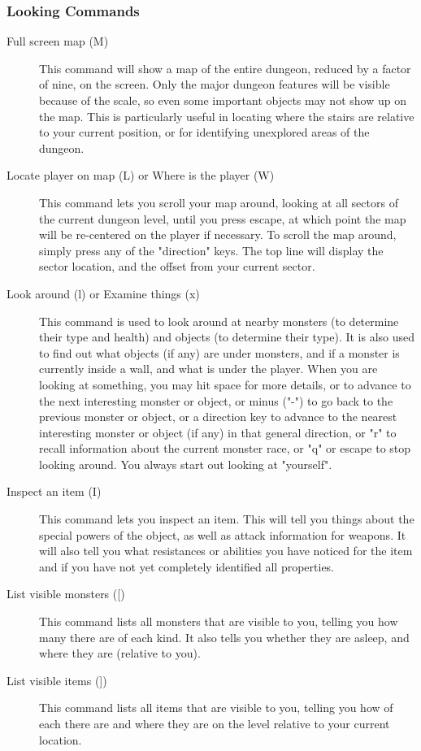 \subsubsection{Looking Commands} 
\begin{description}
\item[Full screen map (M)]
  This command will show a map of the entire dungeon, reduced by a factor
  of nine, on the screen. Only the major dungeon features will be visible
  because of the scale, so even some important objects may not show up on
  the map. This is particularly useful in locating where the stairs are
  relative to your current position, or for identifying unexplored areas
  of the dungeon.

\item[Locate player on map (L) or Where is the player (W)]
  This command lets you scroll your map around, looking at all sectors of
  the current dungeon level, until you press escape, at which point the
  map will be re-centered on the player if necessary. To scroll the map
  around, simply press any of the "direction" keys. The top line will
  display the sector location, and the offset from your current sector.

\item[Look around (l) or Examine things (x)]
  This command is used to look around at nearby monsters (to determine
  their type and health) and objects (to determine their type). It is also
  used to find out what objects (if any) are under monsters, and if a
  monster is currently inside a wall, and what is under the player.  When
  you are looking at something, you may hit space for more details, or to
  advance to the next interesting monster or object, or minus ("-") to go
  back to the previous monster or object, or a direction key to advance to
  the nearest interesting monster or object (if any) in that general
  direction, or "r" to recall information about the current monster race,
  or "q" or escape to stop looking around. You always start out looking at
  "yourself".

\item[Inspect an item (I)]
  This command lets you inspect an item.  This will tell you things about
  the special powers of the object, as well as attack information for
  weapons. It will also tell you what resistances or abilities you have
  noticed for the item and if you have not yet completely identified all
  properties.
        
\item[List visible monsters ([)]
  This command lists all monsters that are visible to you, telling you how
  many there are of each kind. It also tells you whether they are asleep,
  and where they are (relative to you).

\item[List visible items ({]})]
  This command lists all items that are visible to you, telling you how of
  each there are and where they are on the level relative to your current
  location.
\end{description}

